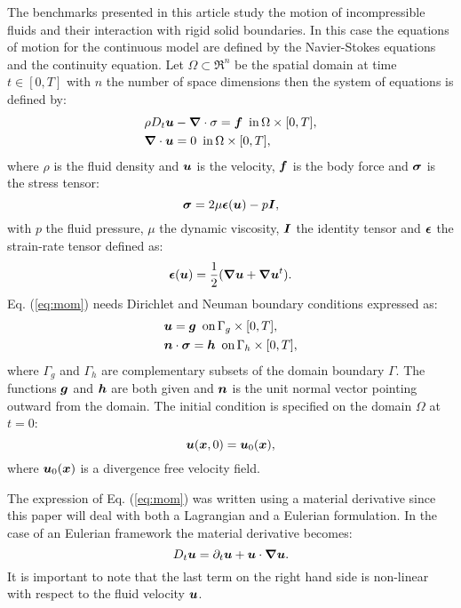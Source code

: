 The benchmarks presented in this article study the motion of incompressible fluids and their interaction with rigid solid boundaries. In this case the equations of motion for the continuous model are defined by the Navier-Stokes equations and the continuity equation. Let $\Omega\subset \Re^n$ be the spatial domain at time $t\in[0,T]$ with $n$ the number of space dimensions then the system of equations is defined by:
%
\begin{eqnarray}
&\rho D_t\boldsymbol{u}-\boldsymbol{\nabla}\cdot\sigma=\boldsymbol{f} \,\,\, \text{in}\, \Omega\times[0,T], \label{eq:mom}\\
&\boldsymbol{\nabla}\cdot \boldsymbol{u}=0 \label{eq:cont} \,\,\, \text{in}\, \Omega\times[0,T],
\end{eqnarray}
%
where $\rho$ is the fluid density and $\boldsymbol{u}$ is the velocity, $\boldsymbol{f}$ is the body force and $\boldsymbol{\sigma}$ is the stress tensor:
%
\begin{equation}
\boldsymbol{\sigma}=2\mu\boldsymbol{\epsilon}(\boldsymbol{u})-p\boldsymbol{I},
\end{equation}
%
with $p$ the fluid pressure, $\mu$ the dynamic viscosity, $\boldsymbol{I}$ the identity tensor and $\boldsymbol{\epsilon}$ the strain-rate tensor defined as:
%
\begin{equation}
  \boldsymbol{\epsilon}(\boldsymbol{u})=\frac{1}{2}(\boldsymbol{\nabla}\boldsymbol{u}+\boldsymbol{\nabla}\boldsymbol{u}^t).
\end{equation}
%
Eq. (\ref{eq:mom}) needs Dirichlet and Neuman boundary conditions expressed as:
%
\begin{eqnarray}
  &\boldsymbol{u}=\boldsymbol{g} \,\,\, \text{on}\, \Gamma_g\times[0,T],\\
  &\boldsymbol{n}\cdot\boldsymbol{\sigma}=\boldsymbol{h} \,\,\, \text{on}\, \Gamma_h\times[0,T],
\end{eqnarray}
%
where $\Gamma_g$ and $\Gamma_h$ are complementary subsets of the domain boundary $\Gamma$. The functions $\boldsymbol{g}$ and $\boldsymbol{h}$ are both given and $\boldsymbol{n}$ is the unit normal vector pointing outward from the domain.
The initial condition is specified on the domain $\Omega$ at $t=0$:
%
\begin{equation}
  \boldsymbol{u}(\boldsymbol{x},0)=\boldsymbol{u}_0(\boldsymbol{x}),
\end{equation}
%
where $\boldsymbol{u}_0(\boldsymbol{x})$ is a divergence free velocity field.

The expression of Eq. (\ref{eq:mom}) was written using a material derivative since this paper will deal with both a Lagrangian and a Eulerian formulation. In the case of an Eulerian framework the material derivative becomes:
\begin{equation}
D_t\boldsymbol{u}=\partial_t\boldsymbol{u}+\boldsymbol{u} \cdot \boldsymbol{\nabla}\boldsymbol{u}.
\end{equation}
It is important to note that the last term on the right hand side is non-linear with respect to the fluid velocity $\boldsymbol{u}$.
